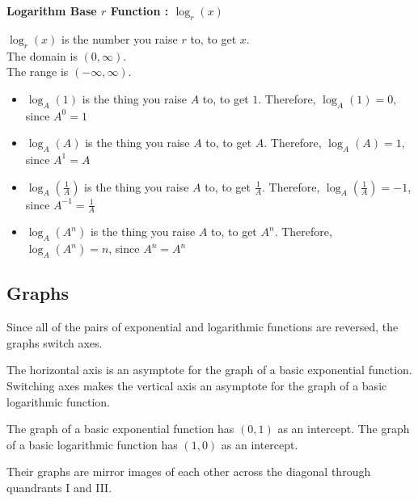 \documentclass{ximera}
\begin{document}
\begin{definition} \textbf{\textcolor{green!50!black}{Logarithm Base $r$ Function : $\log_r(x)$}}


$\log_r(x)$ is the number you raise $r$ to, to get $x$. \\

The domain is $(0, \infty)$. \\

The range is $(-\infty, \infty)$.


\end{definition}




\begin{conclusion}

\begin{itemize}
\item $\log_A(1)$ is the thing you raise $A$ to, to get $1$. Therefore, $\log_A(1) = 0$, since $A^0 = 1$
\item $\log_A(A)$ is the thing you raise $A$ to, to get $A$. Therefore, $\log_A(A) = 1$, since $A^1 = A$
\item $\log_A(\tfrac{1}{A})$ is the thing you raise $A$ to, to get $\tfrac{1}{A}$. Therefore, $\log_A(\tfrac{1}{A}) = -1$, since $A^{-1} = \tfrac{1}{A}$
\item $\log_A(A^n)$ is the thing you raise $A$ to, to get $A^n$. Therefore, $\log_A(A^n) = n$, since $A^n = A^n$
\end{itemize}

\end{conclusion}





\subsection*{Graphs}

Since all of the pairs of exponential and logarithmic functions are reversed, the graphs switch axes.



The horizontal axis is an asymptote for the graph of a basic exponential function. Switching axes makes the vertical axis an asymptote for the graph of a basic logarithmic function.


The graph of a basic exponential function has $(0,1)$ as an intercept.  The graph of a basic logarithmic function has $(1,0)$ as an intercept. 


Their graphs are mirror images of each other across the diagonal through quandrants I and III.
\end{document}
